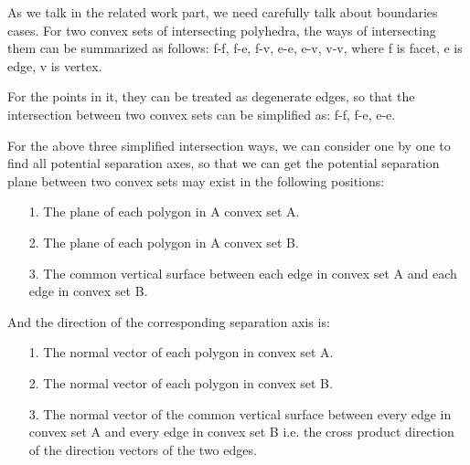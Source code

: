 \documentclass[acmtog]{acmart}
\begin{document}
	As we talk in the related work part, we need carefully talk about boundaries cases. For two convex sets of intersecting polyhedra, the ways of intersecting them can be summarized as follows: f-f, f-e, f-v, e-e, e-v, v-v, where f is facet, e is edge, v is vertex. 
	
	\quad For the points in it, they can be treated as degenerate edges, so that the intersection between two convex sets can be simplified as: f-f, f-e, e-e.
	
	\quad For the above three simplified intersection ways, we can consider one by one to find all potential separation axes, so that we can get the potential separation plane between two convex sets may exist in the following positions:
	
	\begin{itemize}
		\item[1.] The plane of each polygon in A convex set A.
		
		\item[2.] The plane of each polygon in A convex set B.
		
		\item[3.]  The common vertical surface between each edge in convex set A and each edge in convex set B.

	\end{itemize}

	\quad And the direction of the corresponding separation axis is:
	
	\begin{itemize}
		\item[1.] The normal vector of each polygon in convex set A.
		
		\item[2.] The normal vector of each polygon in convex set B.
		
		\item[3.] The normal vector of the common vertical surface between every edge in convex set A and every edge in convex set B i.e. the cross product direction of the direction vectors of the two edges.
		
	\end{itemize}
\end{document}
